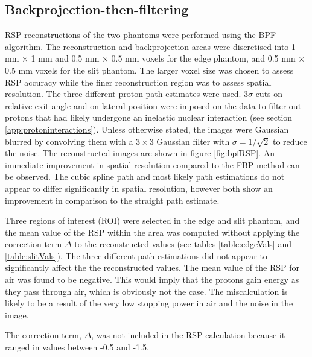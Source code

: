 \documentclass[11pt,a4paper]{article}
\begin{document}
\FloatBarrier

\subsection{Backprojection-then-filtering}
RSP reconstructions of the two phantoms were performed using the BPF algorithm. The reconstruction and backprojection areas were discretised into 1 mm $\times $ 1 mm and 0.5 mm $\times$ 0.5 mm voxels for the edge phantom, and 0.5 mm $\times$ 0.5 mm voxels for the slit phantom. The larger voxel size was chosen to assess RSP accuracy while the finer reconstruction region was to assess spatial resolution. The three different proton path estimates were used. $3 \sigma$ cuts on relative exit angle and on lateral position were imposed on the data to filter out protons that had likely undergone an inelastic nuclear interaction (see section \ref{app:protoninteractions}). Unless otherwise stated, the images were Gaussian blurred by convolving them with a $3 \times 3$ Gaussian filter with $\sigma = 1/\sqrt{2}$ to reduce the noise. The reconstructed images are shown in figure \ref{fig:bpfRSP}. An immediate improvement in spatial resolution compared to the FBP method can be observed. The cubic spline path and most likely path estimations do not appear to differ significantly in spatial resolution, however both show an improvement in comparison to the straight path estimate. 

Three regions of interest (ROI) were selected in the edge and slit phantom, and the mean value of the RSP within the area was computed without applying the correction term $\Delta$ to the reconstructed values (see tables \ref{table:edgeVals} and \ref{table:slitVals}). The three different path estimations did not appear to significantly affect the the reconstructed values. The mean value of the RSP for air was found to be negative. This would imply that the protons gain energy as they pass through air, which is obviously not the case. The miscalculation is likely to be a result of the very low stopping power in air and the noise in the image.

The correction term, $\Delta$, was not included in the RSP calculation because it ranged in values between -0.5 and -1.5.
\end{document}
